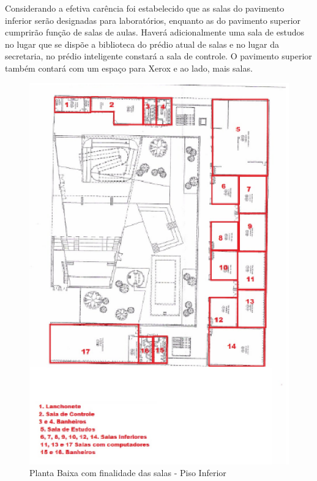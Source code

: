 Considerando a efetiva carência foi estabelecido que as salas do pavimento inferior serão designadas para laboratórios, enquanto as do pavimento superior cumprirão função de salas de aulas. Haverá adicionalmente uma sala de estudos no lugar que se dispõe a biblioteca do prédio atual de salas e no lugar da secretaria, no prédio inteligente constará a sala de controle. O pavimento superior também contará com um espaço para Xerox e ao lado, mais salas.

\begin{figure}[!ht]
  \centering
  \includegraphics[keepaspectratio=true,scale=1]{figuras/plantabaixa1.eps}
  \caption{Planta Baixa com finalidade das salas - Piso Inferior}
  \label{fig:planta_salas_inferior}
\end{figure}

